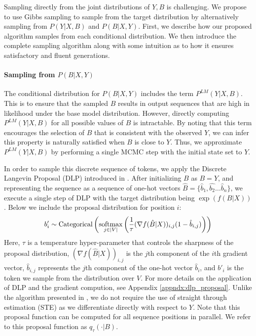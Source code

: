 Sampling directly from the joint distributions of $Y, B$ is challenging. We propose to use Gibbs sampling to sample from the target distribution by alternatively sampling from $P(Y | X, B)$ and $P(B | X, Y)$. First, we describe how our proposed algorithm samples from each conditional distribution. We then introduce the complete sampling algorithm along with some intuition as to how it ensures satisfactory and fluent generations. 

\paragraph{Sampling from $P(B | X, Y)$} 
The conditional distribution for $P(B | X, Y)$ includes the term $P^{LM}(Y | X, B)$. This is to ensure that the sampled $B$ results in output sequences that are high in likelihood under the base model distribution. 
However, directly computing \( P^{LM}(Y | X, B) \) for all possible values of \( B \) is intractable. 
By noting that this term encourages the selection of \( B \) that is consistent with the observed \( Y \), we can infer this property is naturally satisfied when $B$ is close to $Y$. 
Thus, we approximate \( P^{LM}(Y | X, B) \) by performing a single MCMC step with the initial state set to $Y$. 

In order to sample this discrete sequence of tokens, we apply the Discrete Langevin Proposal (DLP) introduced in \citep{zhang2022langevinlike}. 
After initializing $B$ as $B = Y$, and representing the sequence as a sequence of one-hot vectors $\hat{B} = \{\hat{b}_1, \hat{b_2} \dots \hat{b}_n\}$, we execute a single step of DLP with the target distribution being $\exp(f(B | X))$. Below we include the proposal distribution for position $i$:
\begin{align}
\label{eq:dlp_prop}
    b'_i \sim \operatorname*{Categorical}\left(\underset{j \in |V|}{\mathrm{softmax}} \left( \frac{1}{\tau} (\nabla f(\hat{B} | X))_{i,j} (1 - \hat{b}_{i,j}) \right) \right)
\end{align}
Here, $\tau$ is a temperature hyper-parameter that controls the sharpness of the proposal distribution, $(\nabla f(\hat{B} | X))_{i,j}$ is the $j$th component of the $i$th gradient vector, $\hat{b}_{i,j}$ represents the $j$th component of the one-hot vector $\hat{b}_i$, and $b'_i$ is the token we sample from the distribution over $V$. 
For more details on the application of DLP and the gradient compution, see Appendix \ref{appndx:dlp_proposal}.
Unlike the algorithm presented in \citet{liu2023bolt}, we do not require the use of straight through estimation (STE) \citep{bengio2013estimating} as we differentiate directly with respect to $Y$.
Note that this proposal function can be computed for all sequence positions in parallel. 
We refer to this proposal function as $q_\tau(\cdot | B)$. 

